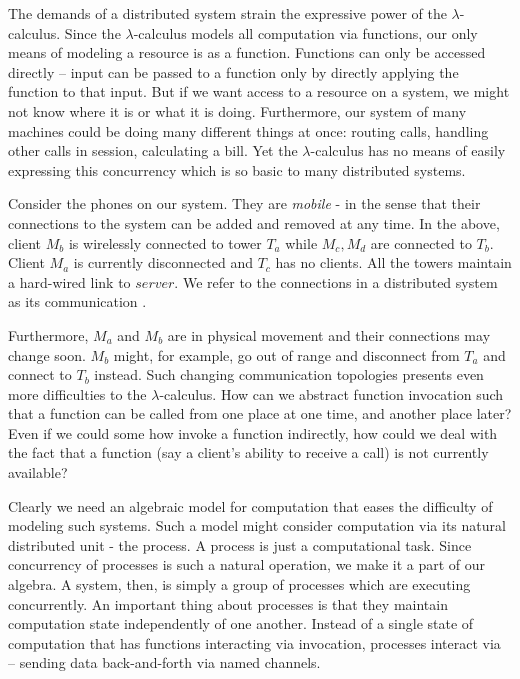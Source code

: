 The demands of a distributed system strain the expressive power of the $\lambda$-calculus.  Since the $\lambda$-calculus models all computation via functions, our only means of modeling a resource is as a function.  Functions can only be accessed directly -- input can be passed to a function only by directly applying the function to that input.  But if we want access to a resource on a system, we might not know where it is or what it is doing.  Furthermore, our system of many machines could be doing many different things at once: routing calls, handling other calls in session, calculating a bill.  Yet the $\lambda$-calculus has no means of easily expressing this concurrency which is so basic to many distributed systems.


Consider the phones on our system.  They are \emph{mobile} - in the sense that their connections to the system can be added and removed at any time.  In the  above, client $M_b$ is wirelessly connected to tower $T_a$ while $M_c,M_d$ are connected to $T_b$.  Client $M_a$ is currently disconnected and $T_c$ has no clients.  All the towers maintain a hard-wired link to $server$.  We refer to the connections in a distributed system as its communication .

Furthermore, $M_a$ and $M_b$ are in physical movement and their connections may change soon.  $M_b$ might, for example, go out of range and disconnect from $T_a$ and connect to $T_b$ instead.  Such changing communication topologies presents even more difficulties to the $\lambda$-calculus.  How can we abstract function invocation such that a function can be called from one place at one time, and another place later?  Even if we could some how invoke a function indirectly, how could we deal with the fact that a function (say a client's ability to receive a call) is not currently available?

Clearly we need an algebraic model for computation that eases the difficulty of modeling such systems.  Such a model might consider computation via its natural distributed unit - the process.  A process is just a computational task.  Since concurrency of processes is such a natural operation, we make it a part of our algebra.  A system, then, is simply a group of processes which are executing concurrently. An important thing about processes is that they maintain computation state independently of one another.  Instead of a single state of computation that has functions interacting via invocation, processes interact via  -- sending data back-and-forth via named channels.  


